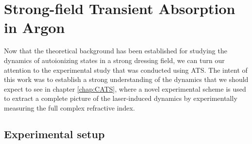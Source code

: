 
\section{Strong-field Transient Absorption in Argon}
\label{sec:ATS_ar}

Now that the theoretical background has been established for studying the dynamics of autoionizing states in a strong dressing field, we can turn our attention to the experimental study that was conducted using ATS.  The intent of this work was to establish a strong understanding of the dynamics that we should expect to see in chapter \ref{chap:CATS}, where a novel experimental scheme is used to extract a complete picture of the laser-induced dynamics by experimentally measuring the full complex refractive index.

\subsection{Experimental setup}
\label{sec:ATS_ar_exp_setup}

